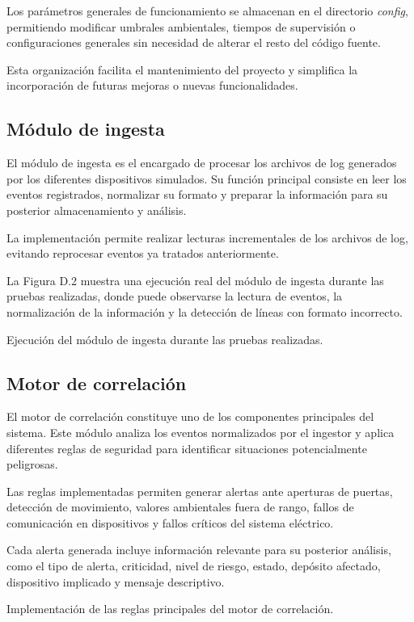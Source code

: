 Los parámetros generales de funcionamiento se almacenan en el directorio \textit{config}, permitiendo modificar umbrales ambientales, tiempos de supervisión o configuraciones generales sin necesidad de alterar el resto del código fuente.

Esta organización facilita el mantenimiento del proyecto y simplifica la incorporación de futuras mejoras o nuevas funcionalidades.

\subsection{Módulo de ingesta}

El módulo de ingesta es el encargado de procesar los archivos de log generados por los diferentes dispositivos simulados. Su función principal consiste en leer los eventos registrados, normalizar su formato y preparar la información para su posterior almacenamiento y análisis.

La implementación permite realizar lecturas incrementales de los archivos de log, evitando reprocesar eventos ya tratados anteriormente.

La Figura D.2 muestra una ejecución real del módulo de ingesta durante las pruebas realizadas, donde puede observarse la lectura de eventos, la normalización de la información y la detección de líneas con formato incorrecto.

{Ejecución del módulo de ingesta durante las pruebas realizadas.}

\subsection{Motor de correlación}

El motor de correlación constituye uno de los componentes principales del sistema. Este módulo analiza los eventos normalizados por el ingestor y aplica diferentes reglas de seguridad para identificar situaciones potencialmente peligrosas.

Las reglas implementadas permiten generar alertas ante aperturas de puertas, detección de movimiento, valores ambientales fuera de rango, fallos de comunicación en dispositivos y fallos críticos del sistema eléctrico.

Cada alerta generada incluye información relevante para su posterior análisis, como el tipo de alerta, criticidad, nivel de riesgo, estado, depósito afectado, dispositivo implicado y mensaje descriptivo.

{Implementación de las reglas principales del motor de correlación.}

